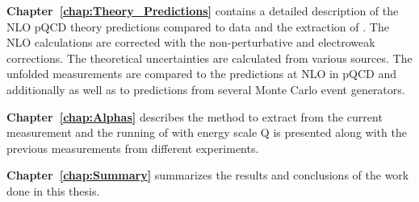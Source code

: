{\bf Chapter~\ref{chap:Theory_Predictions}} contains a detailed description of the NLO pQCD theory predictions compared to data and the extraction of \alps. The NLO calculations are corrected with the non-perturbative and electroweak corrections. The theoretical uncertainties are calculated from various sources. The unfolded measurements are compared to the predictions at NLO in pQCD and additionally as well as to predictions from several Monte Carlo event generators.

{\bf Chapter~\ref{chap:Alphas}} describes the method to extract \alpsmz from the current measurement and the running of \alps with energy scale Q is presented along with the previous measurements from different experiments.

{\bf Chapter~\ref{chap:Summary}} summarizes the results and conclusions of the work done in this thesis.
